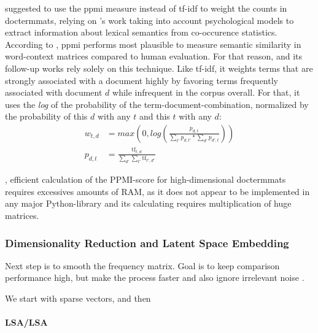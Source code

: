 \textcite{Turney2010} suggested to use the \gls{ppmi} measure instead of \gls{tf-idf} to weight the counts in \glspl{doctermmat}, relying on \cite{Bullinaria2007}'s work taking into account psychological models to extract information about lexical semantics from co-occurence statistics. According to \cite{Turney2010,Bullinaria2007}, \gls{ppmi} performs most plausible to measure semantic similarity in word-context matrices compared to human evaluation. For that reason, \textcite{Derrac2015} and its follow-up works \cite{Ager2018,Alshaikh2020} rely solely on this technique. %
Like tf-idf, it weights terms that are strongly associated with a document highly by favoring terms frequently associated with document $d$ while infrequent in the corpus overall. For that, it uses the \textit{log} of the probability of the term-document-combination, normalized by the probability of this $d$ with any $t$ and this $t$ with any $d$:
\vspace{-3ex}
\begin{align*}
   w_{t,d} &= max\left(0, log\left( \frac{p_{d,t}}{\sum_{t'}p_{d,t'}*\sum_{d'}p_{d',t}} \right) \right) \\
   p_{d,t} &= \frac{\text{tf}_{t,d}}{\sum_{d'}\sum_{t'} \text{tf}_{t',d'}}
\end{align*}

, efficient calculation of the PPMI-score for high-dimensional \glspl{doctermmat} requires excessives amounts of RAM, as it does not appear to be implemented in any major Python-library and its calculating requires multiplication of huge matrices.


\subsubsection{Dimensionality Reduction and Latent Space Embedding}

Next step is to smooth the frequency matrix. Goal is to keep comparison performance high, but make the  process faster and also ignore irrelevant noise \cite{Turney2010}.

We start with sparse vectors, and then  \cite{Derrac2015}


\paragraph*{LSA/LSA}

